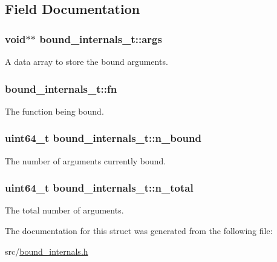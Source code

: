 \subsection{Field Documentation}
\subsubsection[{\texorpdfstring{args}{args}}]{\setlength{\rightskip}{0pt plus 5cm}void$\ast$$\ast$ bound\+\_\+internals\+\_\+t\+::args}\hypertarget{structbound__internals__t_a1dcd077e48f2a5b381de1b03fed7c8eb}{}\label{structbound__internals__t_a1dcd077e48f2a5b381de1b03fed7c8eb}


A data array to store the bound arguments. 

\subsubsection[{\texorpdfstring{fn}{fn}}]{ bound\+\_\+internals\+\_\+t\+::fn}\hypertarget{structbound__internals__t_ac9b29b4f9b69674cef9fb3d083b92521}{}\label{structbound__internals__t_ac9b29b4f9b69674cef9fb3d083b92521}


The function being bound. 

\subsubsection[{\texorpdfstring{n\+\_\+bound}{n_bound}}]{\setlength{\rightskip}{0pt plus 5cm}uint64\+\_\+t bound\+\_\+internals\+\_\+t\+::n\+\_\+bound}\hypertarget{structbound__internals__t_aa959691320a507b149ff25164740a323}{}\label{structbound__internals__t_aa959691320a507b149ff25164740a323}


The number of arguments currently bound. 

\subsubsection[{\texorpdfstring{n\+\_\+total}{n_total}}]{\setlength{\rightskip}{0pt plus 5cm}uint64\+\_\+t bound\+\_\+internals\+\_\+t\+::n\+\_\+total}\hypertarget{structbound__internals__t_a804e2e3c6b4c0ca1814c6884ed0bd161}{}\label{structbound__internals__t_a804e2e3c6b4c0ca1814c6884ed0bd161}


The total number of arguments. 



The documentation for this struct was generated from the following file\+:\begin{DoxyCompactItemize}
\item 
src/\hyperlink{bound__internals_8h}{bound\+\_\+internals.\+h}\end{DoxyCompactItemize}
